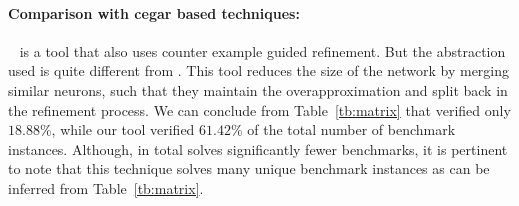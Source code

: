 




\paragraph{Comparison with cegar based techniques: }
\cegarnn{}~\cite{elboher2020abstraction} is a tool that also uses  counter example guided refinement. But the abstraction used is quite different from \deeppoly{}. This tool reduces the size of the network by merging similar neurons, such that they maintain the overapproximation and split back in the refinement process. We can conclude from Table~\ref{tb:matrix} that \cegarnn{} verified only  $18.88\%$, while our tool verified $61.42\%$ of the total number of benchmark instances. Although, in total \cegarnn{} solves significantly fewer benchmarks, it is pertinent to note that this technique solves many unique benchmark instances as can be inferred from Table~\ref{tb:matrix}. %



